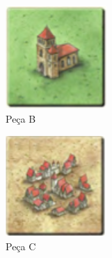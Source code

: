 \documentclass[11pt, a4paper, twoside]{article}
\begin{document}
\begin{figure}[h!]
\centering
\begin{subfigure}{.25\textwidth}
  \centering
  \includegraphics[width=0.8\linewidth]{tileB}
  \caption{Peça B}
\end{subfigure}%
\begin{subfigure}{.25\textwidth}
  \centering
  \includegraphics[width=0.8\linewidth]{tileC}
  \caption{Peça C}
\end{subfigure}%
\begin{subfigure}{.25\textwidth}
  \centering

\end{subfigure}
\end{figure}
\end{document}
